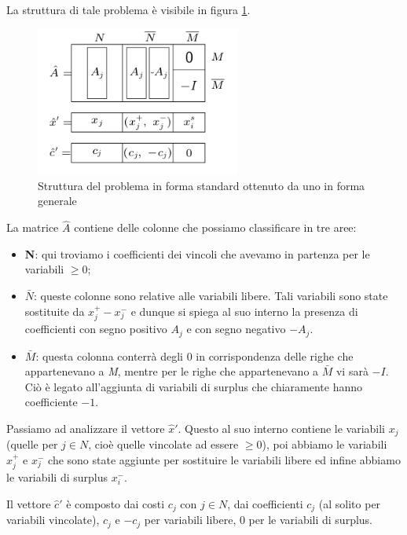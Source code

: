 \documentclass[11pt]{book}
\begin{document}
La struttura di tale problema \`e visibile in figura \ref{cap5fig53}.

\begin{figure}[h!]
  \centering
  \includegraphics[width=0.6\textwidth]{images/cap5fig53.png}
  \caption{Struttura del problema in forma standard ottenuto da uno in
    forma generale}
  \label{cap5fig53}
\end{figure}

La matrice $\hat{A}$ contiene delle colonne che possiamo classificare
in tre aree:

\begin{itemize}
\item {\bf N}: qui troviamo i coefficienti dei vincoli che avevamo in
  partenza per le variabili $\geq 0$;

\item {\bf $\bar{N}$}: queste colonne sono relative alle variabili
  libere. Tali variabili sono state sostituite da $x_j^+-x_j^-$ e
  dunque si spiega al suo interno la presenza di coefficienti con
  segno positivo $A_j$ e con segno negativo $-A_j$.

\item {\bf $\bar{M}$}: questa colonna conterr\`a degli 0 in
  corrispondenza delle righe che appartenevano a {\em M}, mentre per
  le righe che appartenevano a $\bar{M}$ vi sar\`a $-I$. Ci\`o \`e
  legato all'aggiunta di variabili di surplus che chiaramente hanno
  coefficiente $-1$.
\end{itemize}

Passiamo ad analizzare il vettore $\hat{x}'$. Questo al suo interno
contiene le variabili $x_j$ (quelle per $j \in N$, cio\`e quelle
vincolate ad essere $\geq 0$), poi abbiamo le variabili $x_j^+$ e
$x_j^-$ che sono state aggiunte per sostituire le variabili libere ed
infine abbiamo le variabili di surplus $x_i^-$.

Il vettore $\hat{c}'$ \`e composto dai costi $c_j$ con $j \in N$, dai
coefficienti $c_j$ (al solito per variabili vincolate), $c_j$ e $-c_j$
per variabili libere, 0 per le variabili di surplus.
\end{document}
